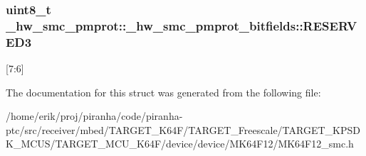 \subsubsection[{\texorpdfstring{R\+E\+S\+E\+R\+V\+E\+D3}{RESERVED3}}]{\setlength{\rightskip}{0pt plus 5cm}uint8\+\_\+t \+\_\+hw\+\_\+smc\+\_\+pmprot\+::\+\_\+hw\+\_\+smc\+\_\+pmprot\+\_\+bitfields\+::\+R\+E\+S\+E\+R\+V\+E\+D3}\hypertarget{struct__hw__smc__pmprot_1_1__hw__smc__pmprot__bitfields_ac64f849c3f2834e27252be8307d6b457}{}\label{struct__hw__smc__pmprot_1_1__hw__smc__pmprot__bitfields_ac64f849c3f2834e27252be8307d6b457}
\mbox{[}7\+:6\mbox{]} 

The documentation for this struct was generated from the following file\+:\begin{DoxyCompactItemize}
\item 
/home/erik/proj/piranha/code/piranha-\/ptc/src/receiver/mbed/\+T\+A\+R\+G\+E\+T\+\_\+\+K64\+F/\+T\+A\+R\+G\+E\+T\+\_\+\+Freescale/\+T\+A\+R\+G\+E\+T\+\_\+\+K\+P\+S\+D\+K\+\_\+\+M\+C\+U\+S/\+T\+A\+R\+G\+E\+T\+\_\+\+M\+C\+U\+\_\+\+K64\+F/device/device/\+M\+K64\+F12/M\+K64\+F12\+\_\+smc.\+h\end{DoxyCompactItemize}
